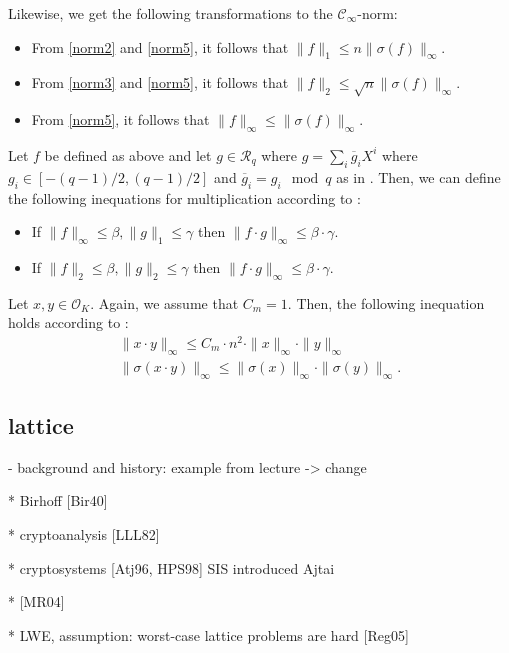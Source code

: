 \documentclass[
  a4paper,  %
  twoside,  %
  bibliography=totoc,
  headsepline,
  cleardoublepage=empty,
  parskip=half,
  draft=false
]{scrbook}
\begin{document}
Likewise, we get the following transformations to the $\mathcal{C}_\infty$-norm:
\begin{itemize}
  \item From \cref{norm2} and \cref{norm5}, it follows that $\| f \|_1 \leq  n \| \sigma(f) \|_\infty$.
  \item From \cref{norm3} and \cref{norm5}, it follows that $\| f \|_2 \leq  \sqrt{n} \| \sigma(f) \|_\infty$.
  \item From \cref{norm5}, it follows that $\| f \|_\infty \leq  \| \sigma(f) \|_\infty$.
\end{itemize}

Let $f$ be defined as above and let $g \in \mathcal{R}_q$ where $g = \sum_i \overline{g}_i X^i$ where $g_i \in \left[-(q-1)/2, (q-1)/2\right]$ and $\overline{g}_i = g_i \mod q$ as in \cite{BDLOP18}. Then, we can define the following inequations for multiplication according to \cite{BDLOP18}:

\begin{itemize}
  \item If $\|f\|_\infty \leq \beta, \|g\|_1 \leq \gamma$ then $\|f \cdot g\|_\infty \leq \beta \cdot \gamma$.
  \item If $\|f\|_2 \leq \beta, \|g\|_2 \leq \gamma$ then $\|f \cdot g\|_\infty \leq \beta \cdot \gamma$.
\end{itemize}

Let $x, y \in \mathcal{O}_K$. Again, we assume that $C_m = 1$. Then, the following inequation holds according to \cite{DPSZ12}:
\begin{align}
  \| x \cdot y \|_\infty \leq C_m \cdot n^2 \cdot \| x \|_\infty \cdot \| y \|_\infty\\
  \| \sigma(x \cdot y) \|_\infty \leq  \| \sigma(x) \|_\infty \cdot \| \sigma(y) \|_\infty.
\end{align}



\subsection{lattice}
- background and history: example from lecture -> change %

  * Birhoff [Bir40]

  * cryptoanalysis [LLL82]

  * cryptosystems [Atj96, HPS98]
    SIS introduced Ajtai \cite{Ajt96}

  * [MR04]

  * LWE, assumption: worst-case lattice problems are hard [Reg05]
\end{document}
